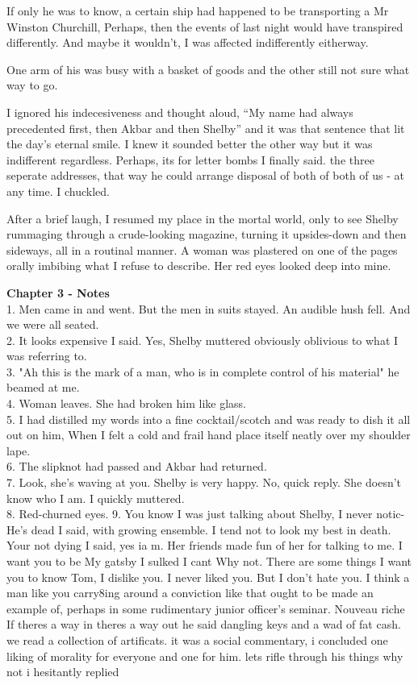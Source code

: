 \documentclass[12pt,openany]{book}
\begin{document}
If only he was to know, a certain
ship had happened to be transporting
a Mr Winston Churchill, Perhaps,
then the events of last night would
have transpired differently. And maybe
it wouldn't, I was affected
indifferently eitherway.

One arm of his was busy with a basket of goods
and the other still not sure what way to go.

I ignored his indecesiveness and thought aloud,
``My name had always precedented first,
then Akbar and then Shelby'' and it
was that sentence that lit the day's
eternal smile. I knew it sounded better
the other way but it was indifferent
regardless. Perhaps, its for letter bombs I
finally said. the three seperate addresses,
that way he could arrange disposal
of both of both of us - at any time. I chuckled.

After a brief laugh, I resumed my place in the
mortal world, only to see Shelby rummaging
through a crude-looking magazine, turning it
upsides-down and then sideways, all in a routinal
manner. A woman was plastered on one of the pages
orally imbibing what I refuse to describe. Her
red eyes looked deep into mine.


\newpage
\textbf{Chapter 3 - Notes}\\
1. Men came in and went. But the
men in suits stayed. An audible
hush fell. And we were all seated.\\
2. It looks expensive I said. Yes, Shelby
muttered obviously oblivious to what
I was referring to.\\
3. "Ah this is the mark of a man,
who is in complete control of his
material" he beamed at me.\\
4. Woman leaves. She had broken
him like glass.\\
5. I had distilled my words
into a fine cocktail/scotch
and was ready to dish it all
out on him, When I felt
a cold and frail hand place
itself neatly over my shoulder
lape.\\
6. The slipknot had passed
and Akbar had returned.\\
7. Look, she's waving at you.
Shelby is very happy. No, quick
reply. She doesn't know who I am.
I quickly muttered.\\
8. Red-churned eyes.
9. You know I was just talking about Shelby, I never notic-
He's dead I said, with growing ensemble.
I tend not to look my best in death. Your not dying I said,
yes ia m.
Her friends made fun of her for talking to me.
I want you to be My gatsby I sulked
I cant
Why not.
There are some things I want you to know Tom,
I dislike you. I never liked you.
But I don't hate you. I think a man like you
carry8ing around a conviction like that
ought to be made an example of, perhaps in some
rudimentary junior officer's seminar.
Nouveau riche
If theres a way in theres a way out
he said dangling keys and a wad of fat cash.
we read a collection of artificats.
it was a social commentary,
i concluded one liking of morality
for everyone and one
for him.
lets rifle through his things
why not i hesitantly replied
\end{document}
